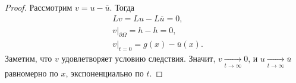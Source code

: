 \begin{proof}
Рассмотрим $v = u - \overline{u}$. Тогда
\begin{align*}
& Lv = Lu - L\overline{u} = 0, \\
& v\Big\rvert_{\partial \Omega} = h - h = 0, \\
& v\Big\rvert_{t = 0} = g(x) - \overline{u}(x).
\end{align*}
Заметим, что $v$ удовлетворяет условию следствия. Значит, $ v \xrightarrow[t \to \infty]{} 0$, и $ u \xrightarrow[t \to \infty]{} \overline{u}$ равномерно по $x$, экспоненциально по $t$.

\end{proof}